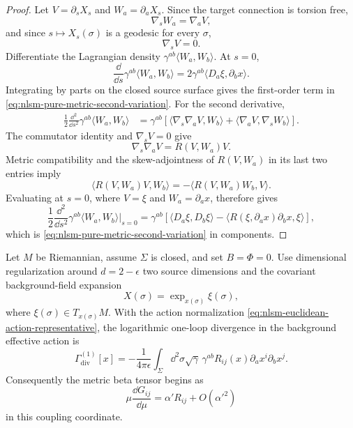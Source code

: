 \begin{proof}
Let \(V=\partial_sX_s\) and \(W_a=\partial_aX_s\).  Since the target
connection is torsion free,
\[
  \nabla_sW_a=\nabla_aV,
\]
and since \(s\mapsto X_s(\sigma)\) is a geodesic for every \(\sigma\),
\[
  \nabla_sV=0.
\]
Differentiate the Lagrangian density
\(\gamma^{ab}\langle W_a,W_b\rangle\).  At \(s=0\),
\[
  \frac{\dd}{\dd s}
  \gamma^{ab}\langle W_a,W_b\rangle
  =
  2\gamma^{ab}\langle D_a\xi,\partial_bx\rangle .
\]
Integrating by parts on the closed source surface gives the first-order term in
\eqref{eq:nlsm-pure-metric-second-variation}.  For the second derivative,
\[
\begin{aligned}
  \frac12\frac{\dd^2}{\dd s^2}
  \gamma^{ab}\langle W_a,W_b\rangle
  &=
  \gamma^{ab}
  \left[
    \langle \nabla_s\nabla_aV,W_b\rangle
    +
    \langle \nabla_aV,\nabla_sW_b\rangle
  \right].
\end{aligned}
\]
The commutator identity and \(\nabla_sV=0\) give
\[
  \nabla_s\nabla_aV=R(V,W_a)V .
\]
Metric compatibility and the skew-adjointness of \(R(V,W_a)\) in its last
two entries imply
\[
  \langle R(V,W_a)V,W_b\rangle
  =
  -\langle R(V,W_a)W_b,V\rangle .
\]
Evaluating at \(s=0\), where \(V=\xi\) and \(W_a=\partial_ax\), therefore
gives
\[
  \frac12\frac{\dd^2}{\dd s^2}
  \gamma^{ab}\langle W_a,W_b\rangle\Big|_{s=0}
  =
  \gamma^{ab}
  \left[
    \langle D_a\xi,D_b\xi\rangle
    -
    \langle R(\xi,\partial_ax)\partial_bx,\xi\rangle
  \right],
\]
which is \eqref{eq:nlsm-pure-metric-second-variation} in components.
\end{proof}

\begin{lemma}
\label{lem:nlsm-one-loop-ricci-divergence}
Let \(M\) be Riemannian, assume \(\Sigma\) is closed, and set
\(B=\Phi=0\).  Use dimensional regularization around \(d=2-\epsilon\)
two source dimensions and the covariant background-field expansion
\[
  X(\sigma)=\exp_{x(\sigma)}\xi(\sigma),
\]
where \(\xi(\sigma)\in T_{x(\sigma)}M\).  With the action normalization
\eqref{eq:nlsm-euclidean-action-representative}, the logarithmic one-loop
divergence in the background effective action is
\begin{equation}
  \Gamma^{(1)}_{\mathrm{div}}[x]
  =
  -\frac1{4\pi\epsilon}
  \int_\Sigma
  \dd^2\sigma\sqrt\gamma\,
  \gamma^{ab}
  R_{ij}(x)\partial_ax^i\partial_bx^j .
  \label{eq:nlsm-one-loop-divergent-effective-action}
\end{equation}
Consequently the metric beta tensor begins as
\begin{equation}
  \mu\frac{\dd G_{ij}}{\dd\mu}
  =
  \alpha'R_{ij}+O(\alpha'^2)
  \label{eq:nlsm-one-loop-beta-ricci}
\end{equation}
in this coupling coordinate.
\end{lemma}


